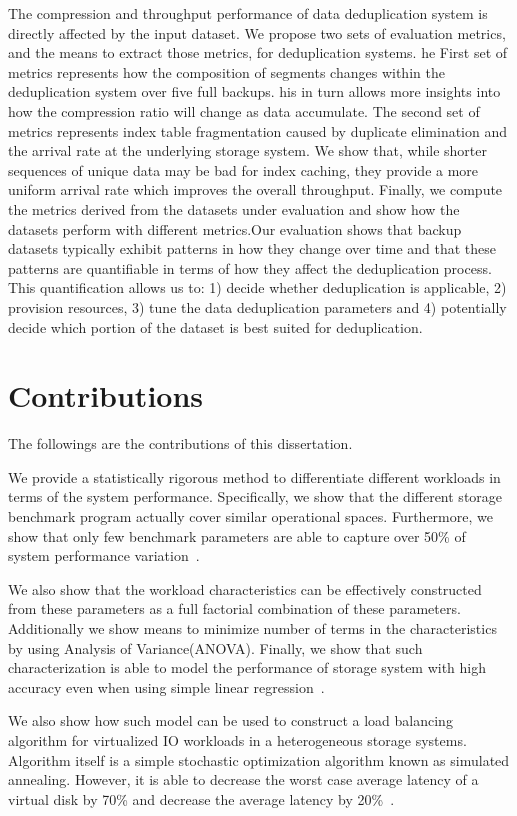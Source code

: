 The compression and throughput performance of data deduplication system is directly affected by the input dataset. 
We propose two sets of evaluation metrics, and the means to extract those metrics, for deduplication systems. 
he First set of metrics represents how the composition of segments changes within the deduplication system over five full backups. 
his in turn allows more insights into how the compression ratio will change as data accumulate.
The second set of metrics represents index table fragmentation caused by duplicate elimination and the arrival rate at the underlying storage system.
We show that, while shorter sequences of unique data may be bad for index caching, they provide a more uniform arrival rate which improves the overall throughput.
Finally, we compute the metrics derived from the datasets  under evaluation and show how the datasets perform with different metrics.Our evaluation shows that backup datasets typically exhibit patterns in how they change over time and that these patterns are quantifiable in terms of how they affect the deduplication process.
This quantification allows us to: 1) decide whether deduplication is applicable, 2) provision resources, 3) tune the data deduplication parameters and 4) potentially decide which portion of the dataset is best suited for deduplication.

\section{Contributions}
The followings are the contributions of this dissertation.

We provide a statistically rigorous method to differentiate different workloads in terms of the system performance. 
Specifically, we show that the different storage benchmark program actually cover similar operational spaces. 
Furthermore, we show that only few benchmark parameters are able to capture over 50\% of system performance variation~\cite{park:2011}. 

We also show that the workload characteristics can be effectively constructed from these parameters as a full factorial combination of these parameters.
Additionally we show means to minimize number of terms in the characteristics by using Analysis of Variance(ANOVA).
Finally, we show that such characterization is able to model the performance of storage system with high accuracy even when using simple linear regression~\cite{park:2012}.

We also show how such model can be used to construct a load balancing algorithm for virtualized IO workloads in a heterogeneous storage systems. 
Algorithm itself is a simple stochastic optimization algorithm known as simulated annealing.
However, it is able to decrease the worst case average latency of a virtual disk by 70\% and decrease the average latency by 20\%~\cite{park:2012}.

